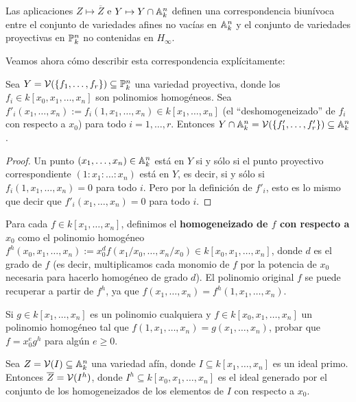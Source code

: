 \documentclass[ACGA.tex]{subfiles}
\begin{document}
\begin{coro}
 Las aplicaciones $Z\mapsto\overline Z$ e $Y\mapsto Y\cap\mathbb{A}^n_k$ definen una correspondencia biunívoca entre el conjunto de variedades afines no vacías en $\mathbb{A}^n_k$ y el conjunto de variedades proyectivas en $\mathbb{P}^n_k$ no contenidas en $H_\infty$.
\end{coro}

Veamos ahora cómo describir esta correspondencia explícitamente:

\begin{prop}
 Sea $Y=\mathcal{V}(\{f_1,\ldots,f_r\})\subseteq\mathbb{P}^n_k$ una variedad proyectiva, donde los $f_i\in k[x_0,x_1,\ldots,x_n]$ son polinomios homogéneos. Sea $f'_i(x_1,\ldots,x_n):=f_i(1,x_1,\ldots,x_n)\in k[x_1,\ldots,x_n]$ (el ``deshomogeneizado'' de $f_i$ con respecto a $x_0$) para todo $i=1,\ldots,r$. Entonces $Y\cap\mathbb{A}^n_k=\mathcal{V}(\{f'_1,\ldots,f'_r\})\subseteq\mathbb{A}^n_k$.
\end{prop}

\begin{proof}
 Un punto $(x_1,\ldots,x_n)\in\mathbb{A}^n_k$ está en $Y$ si y sólo si el punto proyectivo correspondiente $(1:x_1:\ldots:x_n)$ está en $Y$, es decir, si y sólo si $f_i(1,x_1,\ldots,x_n)=0$ para todo $i$. Pero por la definición de $f'_i$, esto es lo mismo que decir que $f'_i(x_1,\ldots,x_n)=0$ para todo $i$.
\end{proof}

Para cada $f\in k[x_1,\ldots,x_n]$, definimos el {\bf homogeneizado de $f$ con respecto a $x_0$} como el polinomio homogéneo $f^h(x_0,x_1,\ldots,x_n):=x_0^df(x_1/x_0,\ldots,x_n/x_0)\in k[x_0,x_1,\ldots,x_n]$, donde $d$ es el grado de $f$ (es decir, multiplicamos cada monomio de $f$ por la potencia de $x_0$ necesaria para hacerlo homogéneo de grado $d$). El polinomio original $f$ se puede recuperar a partir de $f^h$, ya que $f(x_1,\ldots,x_n)=f^h(1,x_1,\ldots,x_n)$.

\begin{ejer}\label{homodeshomo}
 Si $g\in k[x_1,\ldots,x_n]$ es un polinomio cualquiera y $f\in k[x_0,x_1,\ldots,x_n]$ un polinomio homogéneo tal que $f(1,x_1,\ldots,x_n)=g(x_1,\ldots,x_n)$, probar que $f=x_0^eg^h$ para algún $e\geq 0$. 
\end{ejer}


\begin{prop}
 Sea $Z=\mathcal{V}(I)\subseteq\mathbb{A}^n_k$ una variedad afín, donde $I\subseteq k[x_1,\ldots,x_n]$ es un ideal primo. Entonces $\overline Z=\mathcal{V}(I^h)$, donde $I^h\subseteq k[x_0,x_1,\ldots,x_n]$ es el ideal generado por el conjunto de los homogeneizados de los elementos de $I$ con respecto a $x_0$.
\end{prop}
\end{document}
